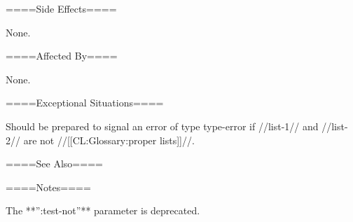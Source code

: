 ====Side Effects====

None.

====Affected By====

None.

====Exceptional Situations====

Should be prepared to signal an error of type type-error if //list-1// and //list-2// are not //[[CL:Glossary:proper lists]]//.

====See Also====

{\secref\TraversalRules}

====Notes====

The **'':test-not''** parameter is deprecated.

 
